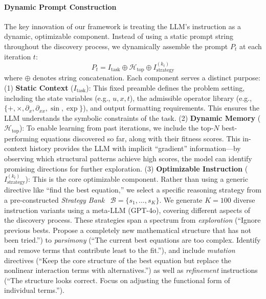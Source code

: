 \documentclass[twoside,11pt]{article}
\newcommand{\1}{{\bf 1}}
\newcommand{\0}{{\bf 0}}
\begin{document}
\paragraph{Dynamic Prompt Construction} The key innovation of our framework is treating the LLM's instruction as a dynamic, optimizable component. Instead of using a static prompt string throughout the discovery process, we dynamically assemble the prompt $P_t$ at each iteration $t$:
\begin{equation}
    P_t = I_{\text{task}} \oplus \mathcal{H}_{\text{top}} \oplus I_{\text{strategy}}^{(k_t)}
\end{equation}
where $\oplus$ denotes string concatenation. Each component serves a distinct purpose: (1) \textbf{Static Context} ($I_{\text{task}}$): This fixed preamble defines the problem setting, including the state variables (e.g., $u, x, t$), the admissible operator library (e.g., $\{+, \times, \partial_x, \partial_{xx}, \sin, \exp\}$), and output formatting requirements. This ensures the LLM understands the symbolic constraints of the task. (2) \textbf{Dynamic Memory} ($\mathcal{H}_{\text{top}}$): To enable learning from past iterations, we include the top-$N$ best-performing equations discovered so far, along with their fitness scores. This in-context history provides the LLM with implicit ``gradient'' information---by observing which structural patterns achieve high scores, the model can identify promising directions for further exploration. (3) \textbf{Optimizable Instruction} ($I_{\text{strategy}}^{(k_t)}$): This is the core optimizable component. Rather than using a generic directive like ``find the best equation,'' we select a specific reasoning strategy from a pre-constructed \textit{Strategy Bank}~\citep{zhou2023ape,sun2024ease} $\mathcal{B} = \{s_1, \ldots, s_K\}$. We generate $K=100$ diverse instruction variants using a meta-LLM (GPT-4o), covering different aspects of the discovery process. These strategies span a spectrum from \textit{exploration} (``Ignore previous bests. Propose a completely new mathematical structure that has not been tried.'') to \textit{parsimony} (``The current best equations are too complex. Identify and remove terms that contribute least to the fit.''), and include \textit{mutation} directives (``Keep the core structure of the best equation but replace the nonlinear interaction terms with alternatives.'') as well as \textit{refinement} instructions (``The structure looks correct. Focus on adjusting the functional form of individual terms.'').
\end{document}
